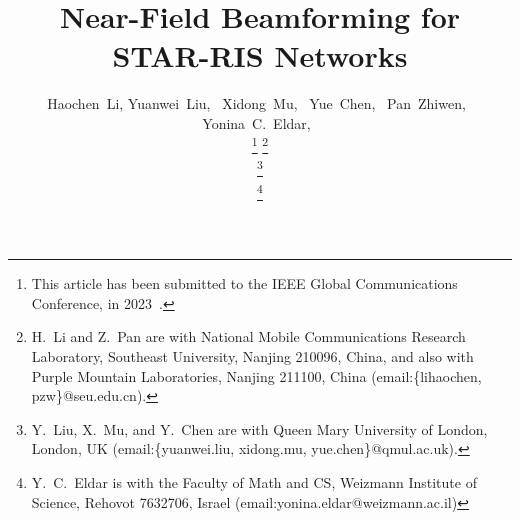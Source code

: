 \documentclass[12pt, draftclsnofoot, onecolumn]{IEEEtran}
\begin{document}
\title{Near-Field Beamforming for STAR-RIS Networks}


\author{

\vspace{-0.3cm}
Haochen~Li,
Yuanwei~Liu,~
Xidong~Mu,~
Yue~Chen,~
Pan~Zhiwen,~
Yonina~C.~Eldar,~

\thanks{This article has been submitted to the IEEE Global Communications Conference, in 2023~\cite{Li}.}
\thanks{H.~Li and Z.~Pan are with National Mobile Communications Research Laboratory, Southeast University, Nanjing 210096, China, and also with Purple Mountain Laboratories, Nanjing 211100, China (email:\{lihaochen, pzw\}@seu.edu.cn).}

\thanks{Y.~Liu, X.~Mu, and Y.~Chen are with Queen Mary University of London, London, UK (email:\{yuanwei.liu, xidong.mu, yue.chen\}@qmul.ac.uk).}

\thanks{Y.~C.~Eldar is with the Faculty of Math and CS, Weizmann Institute of Science, Rehovot 7632706, Israel (email:yonina.eldar@weizmann.ac.il)}

}
\end{document}
